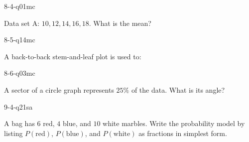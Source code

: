 \begin{practiceQuestion}{8-4-q01}{mc}
\begin{questionText}
Data set A: $10, 12, 14, 16, 18$. What is the mean?
\end{questionText}
\end{practiceQuestion}

\begin{practiceQuestion}{8-5-q14}{mc}
\begin{questionText}
A back-to-back stem-and-leaf plot is used to:
\end{questionText}
\end{practiceQuestion}

\begin{practiceQuestion}{8-6-q03}{mc}
\begin{questionText}
A sector of a circle graph represents $25\%$ of the data. What is its angle?
\end{questionText}
\end{practiceQuestion}

\begin{practiceQuestion}{9-4-q21}{sa}
\begin{questionText}
A bag has $6$ red, $4$ blue, and $10$ white marbles. Write the probability model by listing $P(\text{red})$, $P(\text{blue})$, and $P(\text{white})$ as fractions in simplest form.
\end{questionText}
\end{practiceQuestion}


